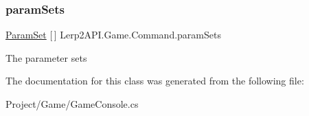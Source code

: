 \subsubsection{\texorpdfstring{param\+Sets}{paramSets}}
{\footnotesize\ttfamily \hyperlink{class_lerp2_a_p_i_1_1_game_1_1_param_set}{Param\+Set} \mbox{[}$\,$\mbox{]} Lerp2\+A\+P\+I.\+Game.\+Command.\+param\+Sets}



The parameter sets 



The documentation for this class was generated from the following file\+:\begin{DoxyCompactItemize}
\item 
Project/\+Game/Game\+Console.\+cs\end{DoxyCompactItemize}
